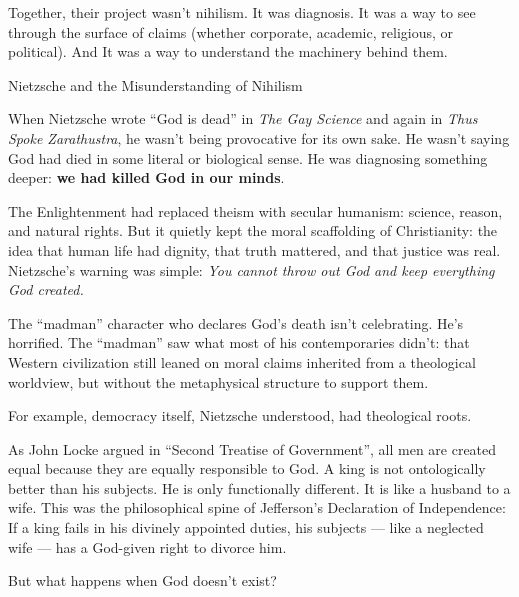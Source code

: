 Together, their project wasn’t nihilism.  
It was diagnosis.  
It was a way to see through the surface of claims (whether corporate, academic, religious, or political). 
And It was a way to understand the machinery behind them.

\medskip

\begin{HistoricalSidebar}{Nietzsche and the Misunderstanding of Nihilism}

  When Nietzsche wrote “God is dead” in \textit{The Gay Science} and again in \textit{Thus Spoke Zarathustra}, 
  he wasn’t being provocative for its own sake.  
  He wasn’t saying God had died in some literal or biological sense.  
  He was diagnosing something deeper: \textbf{we had killed God in our minds}.

  \medskip
  
  The Enlightenment had replaced theism with secular humanism: science, reason, and natural rights.  
  But it quietly kept the moral scaffolding of Christianity: the idea that human life had dignity, that truth mattered, 
  and that justice was real.  
  Nietzsche’s warning was simple: \textit{You cannot throw out God and keep everything God created.}

  \medskip
  
  The ``madman'' character who declares God's death isn’t celebrating. He’s horrified.  
  The ``madman'' saw what most of his contemporaries didn’t: that Western civilization still leaned on 
  moral claims inherited from a theological worldview, but without the metaphysical structure to support them.
  
  \medskip
  
  For example, democracy itself, Nietzsche understood, had theological roots.

  \medskip
  
  As John Locke argued in ``Second Treatise of Government'', all men are created equal because they are equally 
  responsible to God.  
  A king is not ontologically better than his subjects. He is only functionally different. It is like a husband 
  to a wife.  
  This was the philosophical spine of Jefferson’s Declaration of Independence:  
  If a king fails in his divinely appointed duties, his subjects — like a neglected wife — has a God-given right 
  to divorce him.

  \medskip
  
  But what happens when God doesn’t exist?

  \medskip
  

\end{HistoricalSidebar}
